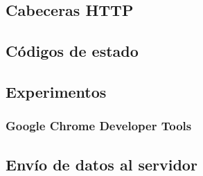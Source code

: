 \documentclass[a4paper,12pt,spanish]{sphinxmanual}
\begin{document}
\subsection{Cabeceras HTTP}
\label{\detokenize{introduccion:cabeceras-http}}

\subsection{Códigos de estado}
\label{\detokenize{introduccion:codigos-de-estado}}

\subsection{Experimentos}
\label{\detokenize{introduccion:experimentos}}

\subsubsection{}
\label{\detokenize{introduccion:telnet}}

\subsubsection{}
\label{\detokenize{introduccion:netcat}}

\subsubsection{}
\label{\detokenize{introduccion:curl}}

\subsubsection{}
\label{\detokenize{introduccion:http}}

\subsubsection{Google Chrome Developer Tools}
\label{\detokenize{introduccion:google-chrome-developer-tools}}

\subsection{Envío de datos al servidor}
\label{\detokenize{introduccion:envio-de-datos-al-servidor}}
\end{document}

